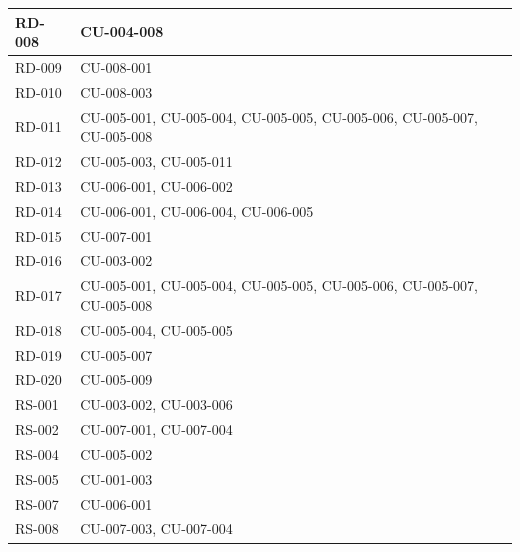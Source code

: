 {\begin{longtable}{|>{\raggedright\arraybackslash}p{2.4cm}|>{\raggedright\arraybackslash}p{12.9cm}|}
RD-008 & CU-004-008 \\ \hline
RD-009 & CU-008-001 \\ \hline
RD-010 & CU-008-003 \\ \hline
RD-011 & CU-005-001, CU-005-004, CU-005-005, CU-005-006, CU-005-007, CU-005-008 \\ \hline
RD-012 & CU-005-003, CU-005-011 \\ \hline
RD-013 & CU-006-001, CU-006-002 \\ \hline
RD-014 & CU-006-001, CU-006-004, CU-006-005 \\ \hline
RD-015 & CU-007-001 \\ \hline
RD-016 & CU-003-002 \\ \hline
RD-017 & CU-005-001, CU-005-004, CU-005-005, CU-005-006, CU-005-007, CU-005-008 \\ \hline
RD-018 & CU-005-004, CU-005-005 \\ \hline
RD-019 & CU-005-007 \\ \hline
RD-020 & CU-005-009 \\ \hline
RS-001 & CU-003-002, CU-003-006 \\ \hline
RS-002 & CU-007-001, CU-007-004 \\ \hline
RS-004 & CU-005-002 \\ \hline
RS-005 & CU-001-003 \\ \hline
RS-007 & CU-006-001 \\ \hline
RS-008 & CU-007-003, CU-007-004 \\ \hline
\end{longtable}}
